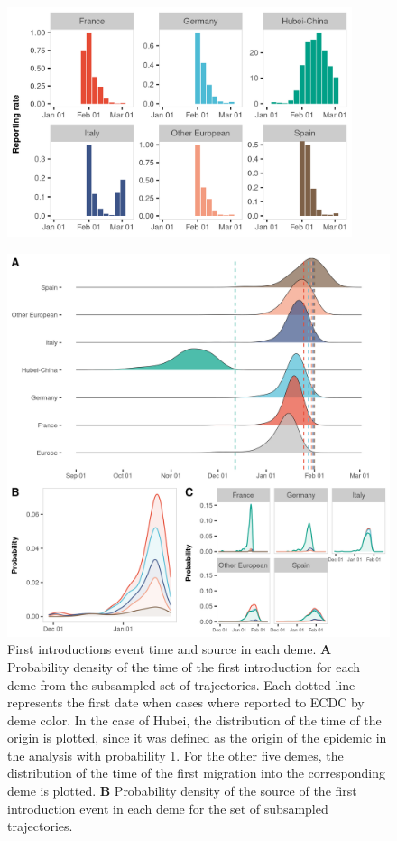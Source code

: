 \documentclass[12pt,]{article}
\begin{document}
\begin{figure}[]
    \centering
    \includegraphics[width=0.9\textwidth]{201030_europe3_figtraj03.png}
    \caption{}
    \label{fig:reported}
\end{figure}


\begin{figure}[]
    \centering
    \includegraphics[width=\textwidth]{201030_europe3_figtraj04.png}
    \caption{First introductions event time and source in each deme. \textbf{A} Probability density of the time of the first introduction for each deme from the subsampled set of trajectories. Each dotted line represents the first date when cases where reported to ECDC by deme color. In the case of Hubei, the distribution of the time of the origin is plotted, since it was defined as the origin of the epidemic in the analysis with probability 1. For the other five demes, the distribution of the time of the first migration into the corresponding deme is plotted. \textbf{B} Probability density of the source of the first introduction event in each deme for the set of subsampled trajectories.}
    \label{fig:first}
\end{figure}
\end{document}
